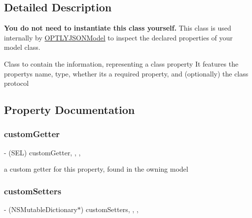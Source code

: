 \subsection{Detailed Description}
{\bfseries You do not need to instantiate this class yourself.} This class is used internally by \mbox{\hyperlink{interface_o_p_t_l_y_j_s_o_n_model}{O\+P\+T\+L\+Y\+J\+S\+O\+N\+Model}} to inspect the declared properties of your model class.

Class to contain the information, representing a class property It features the property\textquotesingle{}s name, type, whether it\textquotesingle{}s a required property, and (optionally) the class protocol 

\subsection{Property Documentation}
\mbox{\label{interface_o_p_t_l_y_j_s_o_n_model_class_property_a300c560be2390b1737bdd6a26f78a6fb}} 
\subsubsection{\texorpdfstring{custom\+Getter}{customGetter}}
{\footnotesize\ttfamily -\/ (S\+EL) custom\+Getter\hspace{0.3cm}{\ttfamily [read]}, {\ttfamily [write]}, {\ttfamily [nonatomic]}, {\ttfamily [assign]}}

a custom getter for this property, found in the owning model \mbox{\label{interface_o_p_t_l_y_j_s_o_n_model_class_property_ac504f59391bee3944c845cbd322e2661}} 
\subsubsection{\texorpdfstring{custom\+Setters}{customSetters}}
{\footnotesize\ttfamily -\/ (N\+S\+Mutable\+Dictionary$\ast$) custom\+Setters\hspace{0.3cm}{\ttfamily [read]}, {\ttfamily [write]}, {\ttfamily [nonatomic]}, {\ttfamily [strong]}}

